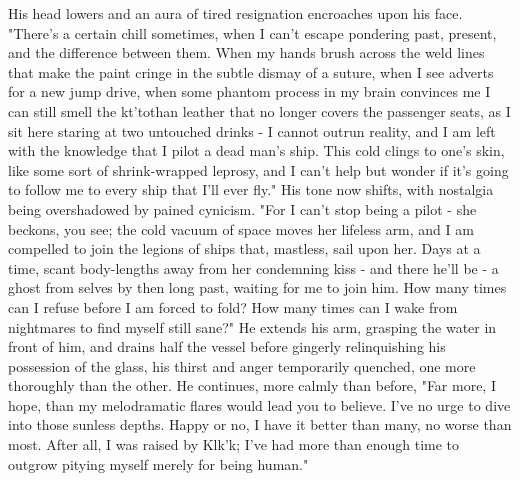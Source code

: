 His head lowers and an aura of tired resignation encroaches upon his
face.  "There's a certain chill sometimes, when I can't escape
pondering past, present, and the difference between them.  When my
hands brush across the weld lines that make the paint cringe in the
subtle dismay of a suture, when I see adverts for a new jump drive,
when some phantom process in my brain convinces me I can still smell
the kt'tothan leather that no longer covers the passenger seats, as I
sit here staring at two untouched drinks - I cannot outrun reality,
and I am left with the knowledge that I pilot a dead man's ship.  This
cold clings to one's skin, like some sort of shrink-wrapped leprosy,
and I can't help but wonder if it's going to follow me to every ship
that I'll ever fly." His tone now shifts, with nostalgia being
overshadowed by pained cynicism. "For I can't stop being a pilot - she
beckons, you see; the cold vacuum of space moves her lifeless arm, and
I am compelled to join the legions of ships that, mastless, sail upon
her.  Days at a time, scant body-lengths away from her condemning kiss
- and there he'll be - a ghost from selves by then long past, waiting
for me to join him.  How many times can I refuse before I am forced to
fold?  How many times can I wake from nightmares to find myself still
sane?" He extends his arm, grasping the water in front of him, and
drains half the vessel before gingerly relinquishing his possession of
the glass, his thirst and anger temporarily quenched, one more
thoroughly than the other. He continues, more calmly than before, "Far
more, I hope, than my melodramatic flares would lead you to
believe. I've no urge to dive into those sunless depths.  Happy or no,
I have it better than many, no worse than most. After all, I was
raised by Klk'k; I've had more than enough time to outgrow pitying
myself merely for being human."

